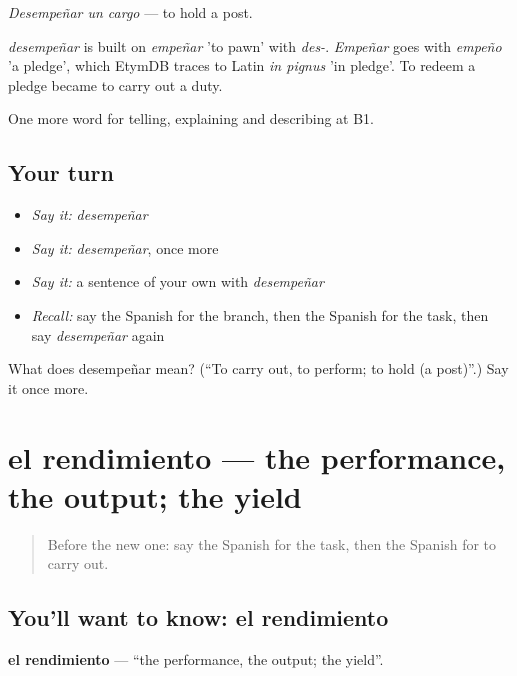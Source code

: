 \emph{Desempeñar un cargo} — to hold a post.

\begin{cousinweb}
\emph{desempeñar} is built on \emph{empeñar} 'to pawn' with \emph{des-}. \emph{Empeñar} goes with \emph{empeño} 'a pledge', which EtymDB traces to Latin \emph{in pignus} 'in pledge'. To redeem a pledge became to carry out a duty.
\end{cousinweb}

\begin{grammarlens}[title={What you've built}]
One more word for telling, explaining and describing at B1.
\end{grammarlens}

\subsection*{Your turn}
\begin{itemize}
\raggedright
  \item \emph{Say it:} \emph{desempeñar}
  \item \emph{Say it:} \emph{desempeñar}, once more
  \item \emph{Say it:} a sentence of your own with \emph{desempeñar}
  \item \emph{Recall:} say the Spanish for the branch, then the Spanish for the task, then say \emph{desempeñar} again
\end{itemize}

\begin{tcolorbox}[breakable,colback=teal!4,colframe=teal!35!black,title={Before you move on}]
What does desempeñar mean? (\textquotedblleft{}To carry out, to perform; to hold (a post)\textquotedblright{}.) Say it once more.
\end{tcolorbox}
\section[el rendimiento]{el rendimiento — the performance, the output; the yield}

\label{lesson:ES-C593-rendimiento}



\begin{quote}
Before the new one: say the Spanish for the task, then the Spanish for to carry out.
\end{quote}

\subsection*{You'll want to know: el rendimiento}
\textbf{el rendimiento} — \textquotedblleft{}the performance, the output; the yield\textquotedblright{}.

